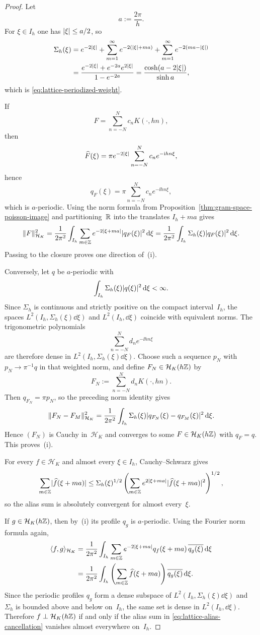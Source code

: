\begin{proof}
Let
\[
a:=\frac{2\pi}{h}.
\]
For $\xi\in I_h$ one has $\lvert \xi\rvert\le a/2$, so
\begin{align*}
\Sigma_h(\xi)
&=e^{-2\lvert \xi\rvert}
+\sum_{m=1}^{\infty}e^{-2(\lvert \xi\rvert+ma)}
+\sum_{m=1}^{\infty}e^{-2(ma-\lvert \xi\rvert)} \\
&=\frac{e^{-2\lvert \xi\rvert}+e^{-2a}e^{2\lvert \xi\rvert}}{1-e^{-2a}}
=\frac{\cosh(a-2\lvert \xi\rvert)}{\sinh a},
\end{align*}
which is \eqref{eq:lattice-periodized-weight}.

If
\[
F=\sum_{n=-N}^{N}c_nK(\cdot,hn),
\]
then
\[
\widehat F(\xi)=\pi e^{-2\lvert \xi\rvert}\sum_{n=-N}^{N}c_ne^{-\mathrm{i} hn\xi},
\]
hence
\[
q_F(\xi)=\pi\sum_{n=-N}^{N}c_ne^{-\ii hn\xi},
\]
which is $a$-periodic.  Using the norm formula from
Proposition~\ref{thm:gram-space-poisson-image} and partitioning~$\mathbb{R}$
into the translates $I_h+ma$ gives
\[
\|F\|_{\mathcal H_K}^2
=\frac{1}{2\pi^2}\int_{I_h}
\sum_{m\in\mathbb{Z}}e^{-2\lvert \xi+ma\rvert}\lvert q_F(\xi)\rvert^2\,\mathrm{d}\xi
=\frac{1}{2\pi^2}\int_{I_h}\Sigma_h(\xi)\lvert q_F(\xi)\rvert^2\,\mathrm{d}\xi.
\]
Passing to the closure proves one direction of~(i).

Conversely, let $q$ be $a$-periodic with
\[
\int_{I_h}\Sigma_h(\xi)\lvert q(\xi)\rvert^2\,\mathrm{d}\xi<\infty.
\]
Since $\Sigma_h$ is continuous and strictly positive on the compact
interval~$I_h$, the spaces
$L^2(I_h,\Sigma_h(\xi)\dd\xi)$ and $L^2(I_h,\dd\xi)$ coincide with
equivalent norms.  The trigonometric polynomials
\[
\sum_{n=-N}^{N}d_ne^{-\ii hn\xi}
\]
are therefore dense in $L^2(I_h,\Sigma_h(\xi)\dd\xi)$.  Choose such a
sequence $p_N$ with $p_N\to \pi^{-1}q$ in that weighted norm, and define
$F_N\in\mathcal H_K(h\mathbb{Z})$ by
\[
F_N:=\sum_{n=-N}^{N}d_nK(\cdot,hn).
\]
Then $q_{F_N}=\pi p_N$, so the preceding norm identity gives
\[
\|F_N-F_M\|_{\mathcal H_K}^2
=\frac{1}{2\pi^2}\int_{I_h}\Sigma_h(\xi)
\lvert q_{F_N}(\xi)-q_{F_M}(\xi)\rvert^2\,\mathrm{d}\xi.
\]
Hence $(F_N)$ is Cauchy in~$\mathcal H_K$ and converges to some
$F\in\mathcal H_K(h\mathbb{Z})$ with $q_F=q$.  This proves~(i).

For every $f\in\mathcal H_K$ and almost every $\xi\in I_h$,
Cauchy--Schwarz gives
\[
\sum_{m\in\mathbb{Z}}\lvert \widehat f(\xi+ma)\rvert
\le
\Sigma_h(\xi)^{1/2}
\left(
\sum_{m\in\mathbb{Z}}e^{2\lvert \xi+ma\rvert}
\lvert \widehat f(\xi+ma)\rvert^2
\right)^{1/2},
\]
so the alias sum is absolutely convergent for almost every~$\xi$.

If $g\in\mathcal H_K(h\mathbb{Z})$, then by~(i) its profile $q_g$ is
$a$-periodic.  Using the Fourier norm formula again,
\begin{align*}
\langle f,g\rangle_{\mathcal H_K}
&=
\frac{1}{2\pi^2}\int_{I_h}
\sum_{m\in\mathbb{Z}}e^{-2\lvert \xi+ma\rvert}q_f(\xi+ma)\,
\overline{q_g(\xi)}\,\mathrm{d}\xi \\
&=
\frac{1}{2\pi^2}\int_{I_h}
\left(
\sum_{m\in\mathbb{Z}}\widehat f(\xi+ma)
\right)\overline{q_g(\xi)}\,\mathrm{d}\xi.
\end{align*}
Since the periodic profiles $q_g$ form a dense subspace of
$L^2(I_h,\Sigma_h(\xi)\dd\xi)$ and $\Sigma_h$ is bounded above and below
on~$I_h$, the same set is dense in $L^2(I_h,\dd\xi)$.  Therefore
$f\perp\mathcal H_K(h\mathbb{Z})$ if and only if the alias sum in
\eqref{eq:lattice-alias-cancellation} vanishes almost everywhere on~$I_h$.


\end{proof}
